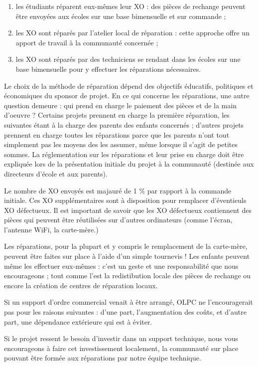 \documentclass[12pt]{article}
\begin{document}
\begin{enumerate}
\item les étudiants réparent eux-mêmes leur XO : des pièces de rechange
   peuvent être envoyées aux écoles sur une base bimensuelle et sur
   commande ;
\item les XO sont réparés par l'atelier local de réparation : cette approche
   offre un apport de travail à la communauté concernée ;
\item les XO sont réparés par des techniciens se rendant dans les écoles sur
   une base bimensuelle pour y effectuer les réparations nécessaires.
\end{enumerate}

Le choix de la méthode de réparation dépend des objectifs éducatifs,
politiques et économiques du sponsor de projet. En ce qui concerne les
réparations, une autre question demeure : qui prend en charge le paiement
des pièces et de la main d'oeuvre ? Certains projets prennent en charge la
première réparation, les suivantes étant à la charge des parents des
enfants concernés ; d'autres projets prennent en charge toutes les
réparations parce que les parents n'ont tout simplement pas les moyens des
les assumer, même lorsque il s'agit de petites sommes. La réglementation
sur les réparations et leur prise en charge doit être expliquée lors de la
présentation initiale du projet à la communauté (destinée aux directeurs
d'école et aux parents).

Le nombre de XO envoyés est majauré de 1 \% par rapport à la commande
initiale. Ces XO supplémentaires sont à disposition pour remplacer
d'éventieuls XO défectueux. Il est important de savoir que les XO
défectueux contiennent des pièces qui peuvent être réutilisées sur d'autres
ordinateurs (comme l'écran, l'antenne WiFi, la carte-mère.)

Les réparations, pour la plupart et y compris le remplacement de la
carte-mère, peuvent être faites sur place à l'aide d'un simple tournevis !
Les enfants peuvent même les effectuer eux-mêmes : c'est un geste et une
responsabilité que nous encourageons ; tout comme l'est la redistibution
locale des pièces de rechange ou encore la création de centres de
réparation locaux.

Si un support d'ordre commercial venait à être arrangé, OLPC ne
l'encouragerait pas pour les raisons suivantes : d'une part, l'augmentation
des coûts, et d'autre part, une dépendance extérieure qui est à éviter.

Si le projet ressent le besoin d'investir dans un support technique, nous
vous encourageons à faire cet investissement localement, la communauté sur
place pouvant être formée aux réparations par notre équipe technique.
\end{document}
